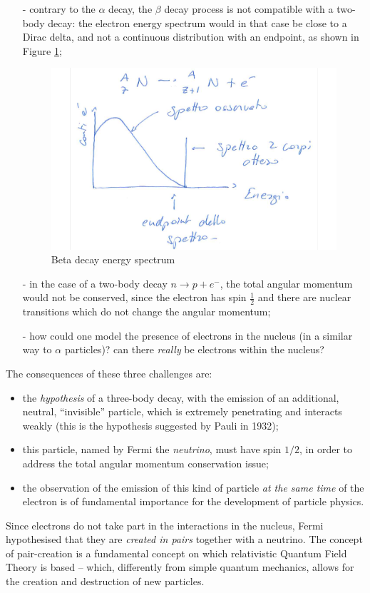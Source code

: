\begin{itemize}
    \item[-] contrary to the $\alpha$ decay, the $\beta$ decay process is not compatible with a two-body decay: the electron energy spectrum would in that case be close to a Dirac delta, and not a continuous distribution with an endpoint, as shown in Figure \ref{nuclear-physics-fig:17};
    \begin{figure}[h]
        \centering
        \includegraphics[scale=0.5]{Figures/nuclear-physics-fig17}
        \caption{Beta decay energy spectrum}
        \label{nuclear-physics-fig:17}
    \end{figure}
    
    \item[-] in the case of a two-body decay \(n\to p+e^-\), the total angular momentum would not be conserved, since the electron has spin $\frac{1}{2}$ and there are nuclear transitions which do not change the angular momentum;
    
    \item[-] how could one model the presence of electrons in the nucleus (in a similar way to $\alpha$ particles)? can there \emph{really} be electrons within the nucleus?
\end{itemize}

The consequences of these three challenges are:
\begin{itemize}
    \item the \emph{hypothesis} of a three-body decay, with the emission of an additional, neutral, ``invisible'' particle, which is extremely penetrating and interacts weakly (this is the hypothesis suggested by Pauli in 1932);
    \item this particle, named by Fermi the \textit{neutrino}, must have spin $1/2$, in order to address the total angular momentum conservation issue;
    \item the observation of the emission of this kind of particle \emph{at the same time} of the electron is of fundamental importance for the development of particle physics.
\end{itemize}
Since electrons do not take part in the interactions in the nucleus, Fermi hypothesised that they are \emph{created in pairs} together with a neutrino. The concept of pair-creation is a fundamental concept on which relativistic Quantum Field Theory is based -- which, differently from simple quantum mechanics, allows for the creation and destruction of new particles.

